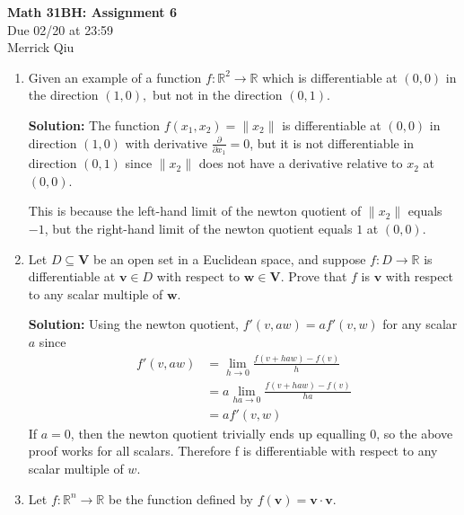 \documentclass{report}
\newcommand{\solution}{\textbf{Solution: }}
\newcommand{\pDiv}[1]{\frac{\partial}{\partial #1}}
\begin{document}
\begin{center}
	\huge{\bf Math 31BH: Assignment 6} \\
	Due 02/20 at 23:59 \\ 
	Merrick Qiu
\end{center}

\bigskip

\begin{enumerate}

	\medskip
	\item
	Given an example of a function $f \colon \mathbb{R}^2 \to \mathbb{R}$ which 
	is differentiable at $(0,0)$ in the direction $(1,0),$ but not in the direction $(0,1).$
	
	\solution 
	The function $f(x_1, x_2) = \|x_2\|$ is differentiable at 
	$(0, 0)$ in direction $(1, 0)$ with derivative $\pDiv{x_1} = 0$, but 
	it is not differentiable in direction $(0, 1)$ since $\|x_2\|$ does not have
	a derivative relative to $x_2$ at $(0, 0)$.

	This is because the left-hand limit of the newton quotient of $\|x_2\|$
	equals $-1$, but the right-hand limit of the newton quotient equals $1$
	at $(0, 0)$.

	\medskip
	\item
	Let $D \subseteq \mathbf{V}$ be an open set in a Euclidean space, and suppose 
	$f \colon D \to \mathbb{R}$ is differentiable at $\mathbf{v} \in D$ with respect to 
	$\mathbf{w} \in \mathbf{V}.$ Prove that $f$ is $\mathbf{v}$ with respect to any 
	scalar multiple of $\mathbf{w}.$

	\solution 
	Using the newton quotient, $f'(v,aw) = af'(v,w)$ for any scalar $a$ since 
	\begin{align*}
		f'(v, aw)
		&= \lim_{h\to0} \frac{f(v+haw) - f(v)}{h} \\
		&= a \lim_{ha\to0} \frac{f(v+haw) - f(v)}{ha} \\
		&= af'(v, w)
	\end{align*}
	If $a=0$, then the newton quotient trivially ends up equalling $0$, 
	so the above proof works for all scalars.
	Therefore f is differentiable with respect to any scalar multiple of $w$.
		
	\medskip
	\item
	Let $f \colon \mathbb{R}^n \to \mathbb{R}$ be the function defined by 
	$f(\mathbf{v}) = \mathbf{v} \cdot \mathbf{v}.$
	
		\begin{enumerate}
		

\end{enumerate}
\end{enumerate}
\end{document}
